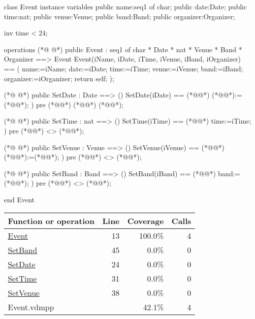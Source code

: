 \begin{vdmpp}[breaklines=true]
class Event
instance variables
 public name:seq1 of char;
  public date:Date;
  public time:nat;
  public venue:Venue;
  public band:Band;
  public organizer:Organizer;
  
  inv time < 24;

operations
(*@
\label{Event:13}
@*)
  public Event : seq1 of char * Date * nat * Venue * Band * Organizer  ==> Event
  Event(iName, iDate, iTime, iVenue, iBand, iOrganizer) == (
   name:=iName;
   date:=iDate;
   time:=iTime;
   venue:=iVenue;
   band:=iBand;
   organizer:=iOrganizer;
   return self;
  );
  
(*@
\label{SetDate:24}
@*)
  public SetDate : Date ==> ()
  SetDate(iDate) == (*@\vdmnotcovered{(}@*)
   (*@@*):=(*@@*);
  )
  pre
   (*@@*) (*@\vdmnotcovered{<>}@*) (*@@*);
   
(*@
\label{SetTime:31}
@*)
  public SetTime : nat ==> ()
  SetTime(iTime) == (*@\vdmnotcovered{(}@*)
   time:=iTime;
  )
  pre
   (*@@*) <> (*@@*);
   
(*@
\label{SetVenue:38}
@*)
  public SetVenue : Venue ==> ()
  SetVenue(iVenue) == (*@\vdmnotcovered{(}@*)
   (*@@*):=(*@@*);
  )
  pre
   (*@@*) <> (*@@*);
   
(*@
\label{SetBand:45}
@*)
  public SetBand : Band ==> ()
  SetBand(iBand) == (*@\vdmnotcovered{(}@*)
   band:=(*@@*);
  )
  pre
   (*@@*) <> (*@@*);

end Event
\end{vdmpp}
\bigskip
\begin{longtable}{|l|r|r|r|}
\hline
Function or operation & Line & Coverage & Calls \\
\hline
\hline
\hyperref[Event:13]{Event} & 13&100.0\% & 4 \\
\hline
\hyperref[SetBand:45]{SetBand} & 45&0.0\% & 0 \\
\hline
\hyperref[SetDate:24]{SetDate} & 24&0.0\% & 0 \\
\hline
\hyperref[SetTime:31]{SetTime} & 31&0.0\% & 0 \\
\hline
\hyperref[SetVenue:38]{SetVenue} & 38&0.0\% & 0 \\
\hline
\hline
Event.vdmpp & & 42.1\% & 4 \\
\hline
\end{longtable}

